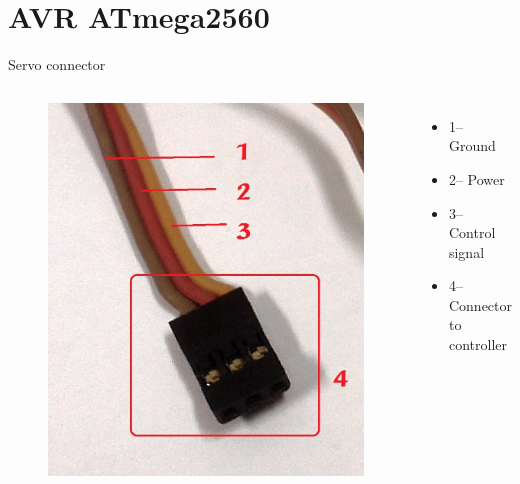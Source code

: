 \documentclass[table,10pt,red]{beamer}	%
\begin{document}
\section{AVR ATmega2560}

\begin{frame}{Servo connector}
	\begin{columns}[c] %
		
		\begin{figure}			
			\includegraphics[width=\linewidth]{"servo female connector"}
		\end{figure}
		\begin{itemize}
			\item %
			1-- Ground
			\item %
			2-- Power
			\item %
			3-- Control signal
			\item
			4-- Connector to controller
		\end{itemize}	
	\end{columns}
\end{frame}
\end{document}
